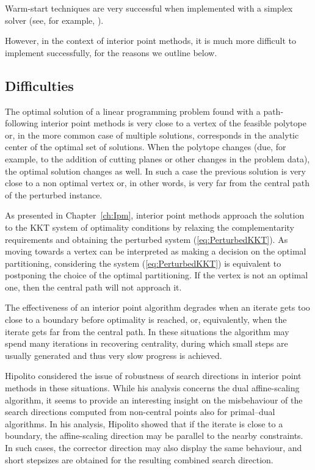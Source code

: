 Warm-start techniques are very successful 
when implemented with a simplex solver (see, for example, 
\cite{Bixby02}). 


However, in the context of interior point methods, it 
is much more difficult to implement successfully, for the reasons
we outline below.

%
%
\subsection{Difficulties}
\label{sec:WarmStartDifficulties}

The optimal solution of a linear programming problem found with 
a path-following interior point methods is very close to a vertex of 
the feasible polytope or, in the more common case of multiple solutions, 
corresponds in the analytic center of the optimal set of solutions.
When the polytope changes (due, for example,
to the addition of cutting planes or other changes in the 
problem data), the optimal solution changes as well.
In such a case the previous solution is very close to a non optimal
vertex or, in other words, is very far from the central path
of the perturbed instance. 

As presented in Chapter~\ref{ch:Ipm}, interior point methods approach 
the solution to the KKT system of optimality conditions by relaxing 
the complementarity requirements and obtaining the perturbed
system (\ref{eq:PerturbedKKT}).
As moving towards a vertex can be interpreted as making 
a decision on the optimal partitioning, considering the 
system (\ref{eq:PerturbedKKT}) is equivalent to postponing 
the choice of the optimal partitioning.
If the vertex is not an 
optimal one, then the central path will not approach it.

The effectiveness of an interior point algorithm degrades when an 
iterate gets too close to a boundary before optimality is reached,
or, equivalently, when the iterate gets far from the central path.
In these situations the algorithm may spend many iterations in recovering
centrality, during which small steps are usually generated and thus
very slow progress is achieved.

Hipolito \cite{Hipolito} considered the issue of robustness of 
search directions in interior point methods in these situations.
While his analysis concerns the dual affine-scaling algorithm, 
it seems to provide an interesting insight on the misbehaviour
of the search directions computed from non-central points also
for primal--dual algorithms.
In his analysis, Hipolito showed that if the iterate is close 
to a boundary, the affine-scaling direction may be parallel to 
the nearby constraints. In such cases, the corrector direction 
may also display the same behaviour, and short stepsizes are 
obtained for the resulting combined search direction.


